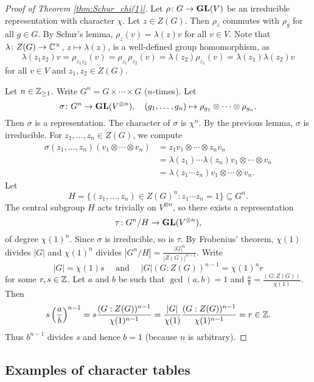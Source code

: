 \begin{proof}[Proof of Theorem \ref{thm:Schur_chi(1)}]
    Let $\rho\colon G\to\mathbf{GL}(V)$ be an irreducible representation 
    with character $\chi$. Let $z\in Z(G)$. Then $\rho_z$ commutes
    with $\rho_g$ for all $g\in G$. By Schur's lemma, 
    $\rho_z(v)=\lambda(z)v$ for all $v\in V$. Note that
    $\lambda\colon Z(G)\to\mathbb{C}^{\times}$, $z\mapsto\lambda(z)$, 
    is a well-defined group homomorphism, as 
    \[
    \lambda(z_1z_2)v=\rho_{z_1z_2}(v)=\rho_{z_1}\rho_{z_2}(v)
    =\lambda(z_2)\rho_{z_1}(v)=\lambda(z_1)\lambda(z_2)v
    \]
    for all $v\in V$ and $z_1,z_2\in Z(G)$. 
    
    Let $n\in\mathbb{Z}_{\geq1}$. Write $G^n=G\times\cdots\times G$ ($n$-times). Let
    \[
    \sigma\colon G^n\to\mathbf{GL}(V^{\otimes n}),\quad
    (g_1,\dots,g_n)\mapsto \rho_{g_1}\otimes\cdots\otimes\rho_{g_n}.
    \]
    Then $\sigma$ is a representation. 
    The character of $\sigma$ is $\chi^n$. By the previous lemma, 
    $\sigma$ is
    irreducible. For $z_1,\dots,z_n\in Z(G)$, we compute
    \begin{align*}   
    \sigma(z_1,\dots,z_n)(v_1\otimes\cdots\otimes v_n)&=z_1v_1\otimes\cdots\otimes z_nv_n\\
    &=\lambda(z_1)\cdots\lambda(z_n)v_1\otimes\cdots\otimes v_n\\
    &=\lambda(z_1\cdots z_n)v_1\otimes\cdots\otimes v_n.
    \end{align*}
    Let 
    \[
    H=\{(z_1,\dots,z_n)\in Z(G)^n:z_1\cdots z_n=1\}\subseteq G^n.
    \]  
    The central subgroup $H$ acts trivially on $V^{\otimes n}$, so there exists
    a representation 
    \[
    \tau\colon G^n/H\to\mathbf{GL}(V^{\otimes n}),
    \]
    of degree $\chi(1)^n$. 
    Since $\sigma$ is irreducible, so is $\tau$. 
    By Frobenius' theorem, $\chi(1)$ divides $|G|$ 
    and $\chi(1)^n$ divides $|G^n/H|=\frac{|G|^n}{|Z(G)|^{n-1}}$. 
    Write 
    \[
    |G|=\chi(1)s\quad\text{ and }\quad 
    |G|(G:Z(G))^{n-1}=\chi(1)^nr
    \]
    for some $r,s\in\mathbb{Z}$. Let $a$ and $b$ be such that 
    $\gcd(a,b)=1$ and 
    $\frac{a}{b}=\frac{(G:Z(G))}{\chi(1)}$. Then
    \[
    s\left(\frac{a}{b}\right)^{n-1}=s\frac{(G:Z(G))^{n-1}}{\chi(1)^{n-1}}
    =\frac{|G|}{\chi(1)}\frac{(G:Z(G))^{n-1}}{\chi(1)^{n-1}}=r\in\mathbb{Z}.
    \]
    Thus $b^{n-1}$ divides $s$ and hence $b=1$ (because $n$ is arbitrary).  
\end{proof}

\subsection{Examples of character tables}

